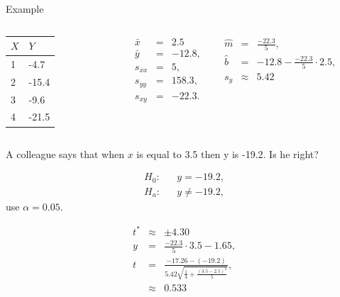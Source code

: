 \begin{frame}{Example}

  \vspace*{-4em}

    \begin{columns}

      \begin{tabular}{l|l}
        $X$ & $Y$ \\ \hline
        1 &  -4.7 \\
        2 & -15.4  \\
        3 &  -9.6 \\
        4 & -21.5 
      \end{tabular}


      \begin{eqnarray*}
        \bar{x} & = & 2.5 \\
        \bar{y} & = & -12.8, \\
        s_{xx} & = & 5, \\
        s_{yy} & = & 158.3, \\
        s_{xy} & = & -22.3.
      \end{eqnarray*}


      \begin{eqnarray*}
        \hat{m} & = & \frac{-22.3}{5}, \\
        \hat{b} & = & -12.8 - \frac{-22.3}{5} \cdot 2.5, \\
        s_y & \approx & 5.42
      \end{eqnarray*}

      \begin{eqnarray*}
      \end{eqnarray*}

    \end{columns}


    \vfill 


    A colleague says that when $x$ is equal to 3.5 then y is -19.2. Is
    he right?

      {
        \begin{eqnarray*}
          H_0: & & y=-19.2, \\
          H_a: & & y\neq -19.2,
        \end{eqnarray*}
        use $\alpha=0.05$.
      }

      {
        \begin{eqnarray*}
          t^* & \approx & \pm 4.30 \\
          y & = & \frac{-22.3}{5} \cdot 3.5 - 1.65, \\
          t & = & \frac{-17.26-(-19.2)}{5.42\sqrt{\frac{1}{4} + \frac{(3.5-2.5)^2}{5}}}, \\
          & \approx &  0.533
        \end{eqnarray*}
      }



\end{frame}
